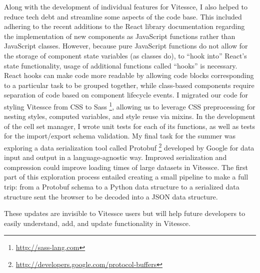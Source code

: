 \documentclass[12pt, letterpaper]{article}
\begin{document}
Along with the development of individual features for Vitessce, I also helped to reduce tech debt and streamline some aspects of the code base.
This included adhering to the recent additions to the React library documentation regarding the implementation of new components as JavaScript functions rather than JavaScript classes.
However, because pure JavaScript functions do not allow for the storage of component state variables (as classes do), to ``hook into'' React's state functionality, usage of additional functions called ``hooks'' is necessary.
React hooks can make code more readable by allowing code blocks corresponding to a particular task to be grouped together, while class-based components require separation of code based on component lifecycle events.
I migrated our code for styling Vitessce from CSS to Sass \footnote{\url{http://sass-lang.com}}, allowing us to leverage CSS preprocessing for nesting styles, computed variables, and style reuse via mixins.
In the development of the cell set manager, I wrote unit tests for each of its functions, as well as tests for the import/export schema validation.
My final task for the summer was exploring a data serialization tool called Protobuf \footnote{\url{http://developers.google.com/protocol-buffers}} developed by Google for data input and output in a language-agnostic way.
Improved serialization and compression could improve loading times of large datasets in Vitessce.
The first part of this exploration process entailed creating a small pipeline to make a full trip: from a Protobuf schema to a Python data structure to a serialized data structure sent the browser to be decoded into a JSON data structure.

These updates are invisible to Vitessce users but will help future developers to easily understand, add, and update functionality in Vitessce.
\end{document}
